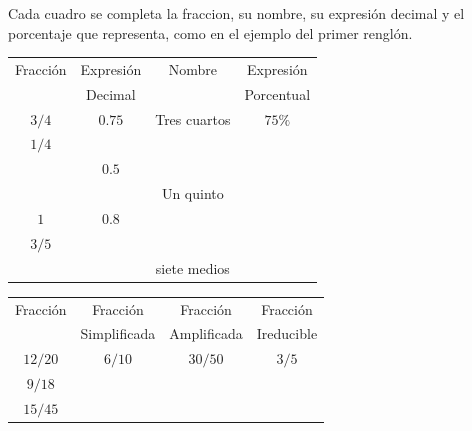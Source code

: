 \documentclass[11pt]{examdesign}
\begin{document}
	
	
    \begin{shortanswer}[title={Completar los siguientes cuadros siguiendo el ejemplo dado:},
    	rearrange=no,resetcounter=no]
    	
        
        \begin{question}
        Cada cuadro se completa la fraccion, su nombre, su expresión decimal y el porcentaje que representa, como en el ejemplo del primer renglón.
        	\begin{multicols}{2}
        		
        		\begin{tabular}{|c|c|c|c|}
        			\hline
        			{\scriptsize Fracción}      &{\scriptsize Expresión}&{\scriptsize Nombre}	 &{\scriptsize Expresión}
        			\\
        			&{\scriptsize Decimal}     &            &{\scriptsize Porcentual}
        			\\\hline
        			$3/4$ & $0.75$  & Tres cuartos&$75\%$
        			\\\hline
        			$1/4$ &         &           &             
        			\\\hline
        			& $0.5$   &           &
        			\\\hline
        			&         & Un quinto&
        			\\\hline
        			$1$           & $0.8$   &           &
        			\\\hline
        			$3/5$ &         &           &
        			\\\hline
        			&         &{\scriptsize siete medios}&
        			\\\hline
        		\end{tabular}
        		\begin{tabular}{|c|c|c|c|}
        			\hline
        			{\scriptsize Fracción}      &{\scriptsize Fracción}     &{\scriptsize Fracción}	 &{\scriptsize Fracción}
        			\\
        			&{\scriptsize Simplificada} &{\scriptsize Amplificada} &{\scriptsize Ireducible}
        			\\\hline
        			$12/20$  & $6/10$  &$30/50$  & $3/5$
        			\\\hline
        			$9/18$   &         &         &             
        			\\\hline
        			$15/45$  &         &         &

\end{tabular}
\end{multicols}
\end{question}
\end{shortanswer}
\end{document}
